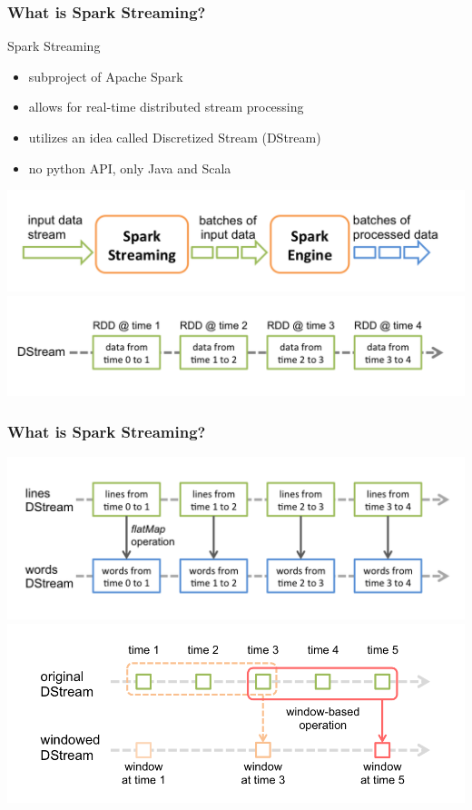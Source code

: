 \documentclass{beamer}
\begin{document}
\begin{frame}
\frametitle{What is Spark Streaming?}

\begin{block}{Spark Streaming}
\begin{itemize}
	\item subproject of Apache Spark\texttrademark
	\item allows for real-time distributed stream processing
	\item utilizes an idea called Discretized Stream (DStream)
	\item no python API, only Java and Scala
\end{itemize}
\vspace{-1em}
\includegraphics[width=\textwidth]{img/streaming-flow.png}
\vspace{-1em}
\includegraphics[width=\textwidth]{img/streaming-dstream.png}
\vspace{-1em}
\end{block}
\end{frame}

\begin{frame}
\frametitle{What is Spark Streaming?}

\includegraphics[width=\textwidth]{img/streaming-dstream-ops.png}
\vspace{-2em}
\includegraphics[width=\textwidth]{img/streaming-dstream-window.png}
\end{frame}
\end{document}
